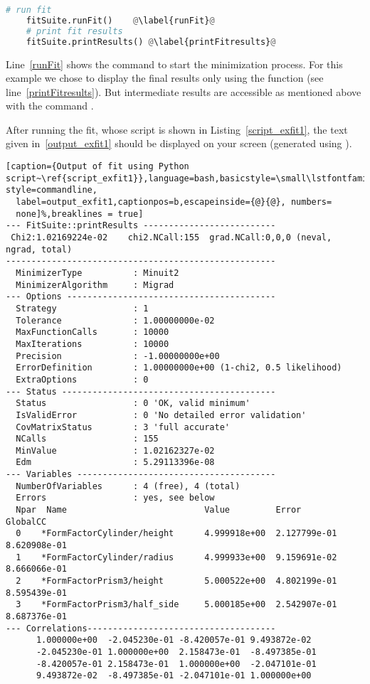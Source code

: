 \begin{lstlisting}[language=python, style=eclipseboxed, name=exfit,nolol]
    # run fit 
    fitSuite.runFit()    @\label{runFit}@
    # print fit results
    fitSuite.printResults() @\label{printFitresults}@
\end{lstlisting}

Line~\ref{runFit} shows the command to start the minimization
process. For this example we chose to display the final results only
using the function  (see
line~\ref{printFitresults}). But intermediate results are accessible as
mentioned above with the command .

After running the fit, whose script is shown in
Listing~\ref{script_exfit1}, the text given in~\ref{output_exfit1} should be displayed on your
screen (generated using ).



\begin{lstlisting}[caption={Output of fit using Python script~\ref{script_exfit1}},language=bash,basicstyle=\small\lstfontfamily,% style=commandline,
  label=output_exfit1,captionpos=b,escapeinside={@}{@}, numbers=
  none]%,breaklines = true]
--- FitSuite::printResults --------------------------
 Chi2:1.02169224e-02    chi2.NCall:155  grad.NCall:0,0,0 (neval, ngrad, total)
-----------------------------------------------------
  MinimizerType          : Minuit2
  MinimizerAlgorithm     : Migrad
--- Options -----------------------------------------
  Strategy               : 1
  Tolerance              : 1.00000000e-02
  MaxFunctionCalls       : 10000
  MaxIterations          : 10000
  Precision              : -1.00000000e+00
  ErrorDefinition        : 1.00000000e+00 (1-chi2, 0.5 likelihood)
  ExtraOptions           : 0
--- Status ------------------------------------------ 
  Status                 : 0 'OK, valid minimum'
  IsValidError           : 0 'No detailed error validation'
  CovMatrixStatus        : 3 'full accurate'
  NCalls                 : 155
  MinValue               : 1.02162327e-02
  Edm                    : 5.29113396e-08
--- Variables ---------------------------------------
  NumberOfVariables      : 4 (free), 4 (total) 
  Errors                 : yes, see below
  Npar  Name                           Value         Error         GlobalCC      
  0    *FormFactorCylinder/height      4.999918e+00  2.127799e-01  8.620908e-01  
  1    *FormFactorCylinder/radius      4.999933e+00  9.159691e-02  8.666066e-01  
  2    *FormFactorPrism3/height        5.000522e+00  4.802199e-01  8.595439e-01  
  3    *FormFactorPrism3/half_side     5.000185e+00  2.542907e-01  8.687376e-01  
--- Correlations-------------------------------------
      1.000000e+00  -2.045230e-01 -8.420057e-01 9.493872e-02  
      -2.045230e-01 1.000000e+00  2.158473e-01  -8.497385e-01 
      -8.420057e-01 2.158473e-01  1.000000e+00  -2.047101e-01 
      9.493872e-02  -8.497385e-01 -2.047101e-01 1.000000e+00
\end{lstlisting}

